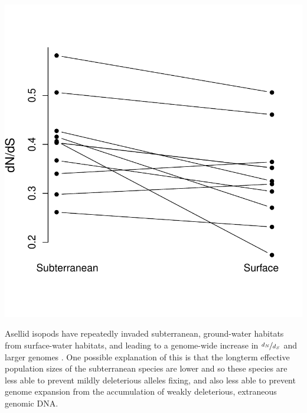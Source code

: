 { \begin{marginfigure}
 \begin{center}
 \includegraphics[width=\textwidth]{Journal_figs/drift_selection/asellid_isopods_Nes/asellid_isopods_Nes.pdf}
 \end{center}
 \caption{ Asellid isopods have repeatedly invaded subterranean, ground-water
habitats from surface-water habitats, and leading to a
genome-wide increase in $\nicefrac{d_N}{d_S}$  and larger genomes \citep[Figure from ][comparing independent isopod species pairs]{lefebure2017less}. One
possible explanation of this is that the longterm effective population
sizes of the subterranean species are lower and so these species are less able to
prevent mildly deleterious alleles fixing, and also less able to prevent genome expansion from the accumulation of weakly deleterious, extraneous
genomic DNA. } \label{fig: asellid_isopods_Nes}
 \end{marginfigure}


}

